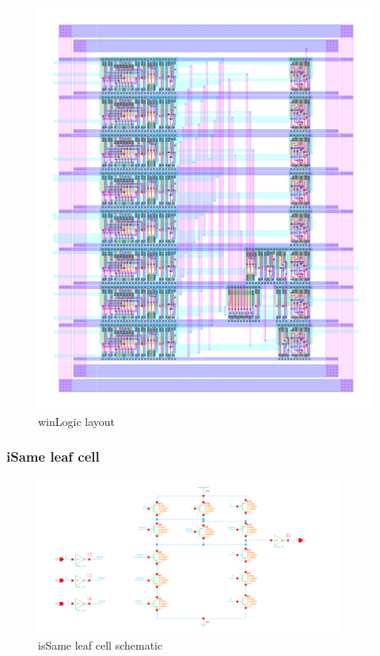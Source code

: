 \documentclass[]{article}
\begin{document}
\begin{figure}[H]
\centering
\includegraphics[width=.9\textwidth]{winLogic-layout}
\caption{winLogic layout}
\label{fig:winLogic-layout}
\end{figure}

\subsubsection{iSame leaf cell}
\begin{figure}[H]
\centering
\includegraphics[width=0.9\textwidth]{isSame-schematic}
\caption{isSame leaf cell schematic}
\label{fig:isSame-schematic}
\end{figure}
\end{document}
